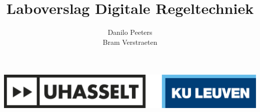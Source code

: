 \documentclass[a4paper, 12pt]{article}
\title{Laboverslag Digitale Regeltechniek}
\author{Danilo Peeters \\ Bram Verstraeten}
\begin{document}
\makeatletter
    \begin{titlepage}
	    \includegraphics[width=1\linewidth]{Logo_Uhasselt_KULeuven.jpeg}\\[30ex]
        \begin{center}
            {\huge \@title }\\[20ex] 
            {\large\@author}
        \end{center}
    \end{titlepage}
\makeatother

\newpage
\end{document}
